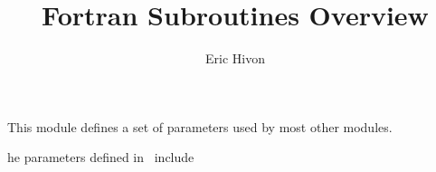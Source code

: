 
\sloppy


\title{\healpix Fortran Subroutines Overview}
 \section[healpix\_types module]{ }
\label{sub:healpix_types}
\author{Eric Hivon}

\begin{facility}
{This module defines a set of parameters used by most other
\healpix modules.}
{\modHealpixTypes}
\end{facility}


\newenvironment{mytable}[1]{%
\begin{minipage}[b]{\linewidth}{%
\renewcommand{\thefootnote}{\fnsymbol{footnote}}
\renewcommand{\footnoterule}{}
{#1}
}%
\end{minipage}
}%

The parameters defined in \thedocid\ include

